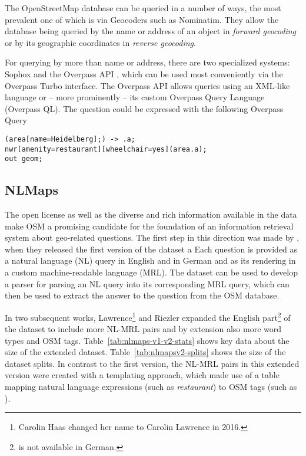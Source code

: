 The OpenStreetMap database can be queried in a number of ways, the most
prevalent one of which is via Geocoders such as
Nominatim. They allow the database being queried by
the name or address of an object in \emph{forward geocoding} or by its
geographic coordinates in \emph{reverse geocoding}.

For querying by more than name or address, there are two specialized systems:
Sophox and the Overpass API
, which can be used most conveniently via the
Overpass Turbo  interface. The Overpass API
allows queries using an XML-like language or – more prominently – its custom
Overpass Query Language (Overpass QL). The question  could be expressed with the
following Overpass Query

\begin{lstlisting}[style=MyOverpassQL,title={Overpass QL for wheelchair-accessible restaurants in Heidelberg}]
(area[name=Heidelberg];) -> .a;
nwr[amenity=restaurant][wheelchair=yes](area.a);
out geom;
\end{lstlisting}

\subsection{NLMaps}
\label{sec:nlmaps}

The open license as well as the diverse and rich information available in the
data make OSM a promising candidate for the foundation of an information
retrieval system about geo-related questions. The first step in this direction
was made by \textcite{haas-2016}, when they released the first version of the
\nlmaps{} dataset a  Each question is provided as a natural
language (NL) query in English and in German and as its rendering in a custom
machine-readable language (MRL). The dataset can be used to develop a parser for
parsing an NL query into its corresponding MRL query, which can then be used to
extract the answer to the question from the OSM database.

In two subsequent works, Lawrence\footnote{Carolin Haas changed her name to
  Carolin Lawrence in 2016.} and Riezler
\parencites*{lawrence-2016}{lawrence-2018} expanded the English
part\footnote{\nlmapstwo{} is not available in German.} of the dataset to
include more NL-MRL pairs and by extension also more word types and OSM tags.
Table~\ref{tab:nlmaps-v1-v2-stats} shows key data about the size of the extended
dataset. Table~\ref{tab:nlmapsv2-splits} shows the size of the dataset splits.
In contrast to the first version, the NL-MRL pairs in this extended version were
created with a templating approach, which made use of a
table mapping natural
language expressions (such as \emph{restaurant}) to OSM tags (such as
).

